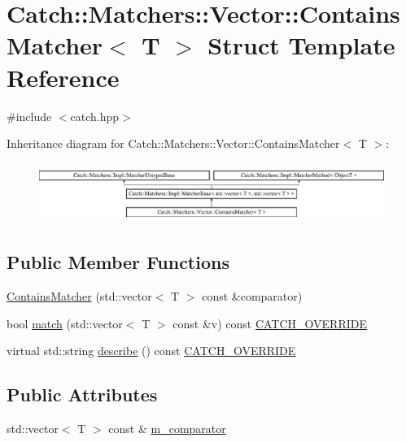 \hypertarget{struct_catch_1_1_matchers_1_1_vector_1_1_contains_matcher}{}\section{Catch\+:\+:Matchers\+:\+:Vector\+:\+:Contains\+Matcher$<$ T $>$ Struct Template Reference}
\label{struct_catch_1_1_matchers_1_1_vector_1_1_contains_matcher}


{\ttfamily \#include $<$catch.\+hpp$>$}

Inheritance diagram for Catch\+:\+:Matchers\+:\+:Vector\+:\+:Contains\+Matcher$<$ T $>$\+:\begin{figure}[H]
\begin{center}
\leavevmode
\includegraphics[height=1.944444cm]{struct_catch_1_1_matchers_1_1_vector_1_1_contains_matcher}
\end{center}
\end{figure}
\subsection*{Public Member Functions}
\begin{DoxyCompactItemize}
\item 
\mbox{\hyperlink{struct_catch_1_1_matchers_1_1_vector_1_1_contains_matcher_ad8e92c8399be6dce75bb5702cdfab700}{Contains\+Matcher}} (std\+::vector$<$ T $>$ const \&comparator)
\item 
bool \mbox{\hyperlink{struct_catch_1_1_matchers_1_1_vector_1_1_contains_matcher_aba81516816a6796124dd4fe4843e7284}{match}} (std\+::vector$<$ T $>$ const \&v) const \mbox{\hyperlink{catch_8hpp_a8ecdce4d3f57835f707915ae831eb847}{C\+A\+T\+C\+H\+\_\+\+O\+V\+E\+R\+R\+I\+DE}}
\item 
virtual std\+::string \mbox{\hyperlink{struct_catch_1_1_matchers_1_1_vector_1_1_contains_matcher_add1a31f049cec89f980424ecdb7027ac}{describe}} () const \mbox{\hyperlink{catch_8hpp_a8ecdce4d3f57835f707915ae831eb847}{C\+A\+T\+C\+H\+\_\+\+O\+V\+E\+R\+R\+I\+DE}}
\end{DoxyCompactItemize}
\subsection*{Public Attributes}
\begin{DoxyCompactItemize}
\item 
std\+::vector$<$ T $>$ const  \& \mbox{\hyperlink{struct_catch_1_1_matchers_1_1_vector_1_1_contains_matcher_a83d051166e4ed0d535219ad6ee99abb2}{m\+\_\+comparator}}
\end{DoxyCompactItemize}
